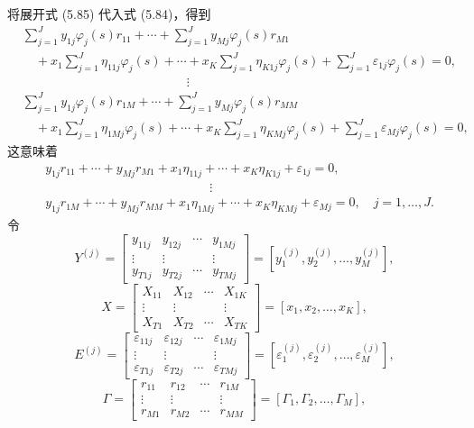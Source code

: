 将展开式 (5.85) 代入式 (5.84)，得到
\begin{equation}
\begin{aligned}
&\sum_{j=1}^Jy_{1j}\varphi_j(s)r_{11}+\cdots+\sum_{j=1}^Jy_{Mj}\varphi_j(s)r_{M1}\\
&\quad+x_1\sum_{j=1}^J\eta_{11j}\varphi_j(s)+\cdots
+x_K\sum_{j=1}^J\eta_{K1j}\varphi_j(s)+\sum_{j=1}^J\varepsilon_{1j}\varphi_j(s)=0,\\
&\hspace{13em}\vdots\\
&\sum_{j=1}^Jy_{1j}\varphi_j(s)r_{1M}+\cdots+\sum_{j=1}^Jy_{Mj}\varphi_j(s)r_{MM}\\
&\quad+x_1\sum_{j=1}^J\eta_{1Mj}\varphi_j(s)+\cdots
+x_K\sum_{j=1}^J\eta_{KMj}\varphi_j(s)+\sum_{j=1}^J\varepsilon_{Mj}\varphi_j(s)=0,
\end{aligned}
\tag{5.86}
\end{equation}
这意味着
\begin{equation}
\begin{aligned}
&y_{1j}r_{11}+\cdots+y_{Mj}r_{M1}+x_1\eta_{11j}+\cdots+x_K\eta_{K1j}+\varepsilon_{1j}=0,\\
&\hspace{13em}\vdots\\
&y_{1j}r_{1M}+\cdots+y_{Mj}r_{MM}+x_1\eta_{1Mj}+\cdots+x_K\eta_{KMj}+\varepsilon_{Mj}=0,
\quad j=1,\ldots,J.
\end{aligned}
\tag{5.87}
\end{equation}
令
\[
Y^{(j)}=\begin{bmatrix}y_{11j}&y_{12j}&\cdots&y_{1Mj}\\\vdots&\vdots&&\vdots\\y_{T1j}&y_{T2j}&\cdots&y_{TMj}\end{bmatrix}
=[y_1^{(j)},y_2^{(j)},\ldots,y_M^{(j)}],
\]
\[
X=\begin{bmatrix}X_{11}&X_{12}&\cdots&X_{1K}\\\vdots&\vdots&&\vdots\\X_{T1}&X_{T2}&\cdots&X_{TK}\end{bmatrix}
=[x_1,x_2,\ldots,x_K],
\]
\[
E^{(j)}=\begin{bmatrix}\varepsilon_{11j}&\varepsilon_{12j}&\cdots&\varepsilon_{1Mj}\\\vdots&\vdots&&\vdots\\\varepsilon_{T1j}&\varepsilon_{T2j}&\cdots&\varepsilon_{TMj}\end{bmatrix}
=[\varepsilon_1^{(j)},\varepsilon_2^{(j)},\ldots,\varepsilon_M^{(j)}],
\]
\[
\Gamma=\begin{bmatrix}r_{11}&r_{12}&\cdots&r_{1M}\\\vdots&\vdots&&\vdots\\r_{M1}&r_{M2}&\cdots&r_{MM}\end{bmatrix}
=[\Gamma_1,\Gamma_2,\ldots,\Gamma_M],
\]
